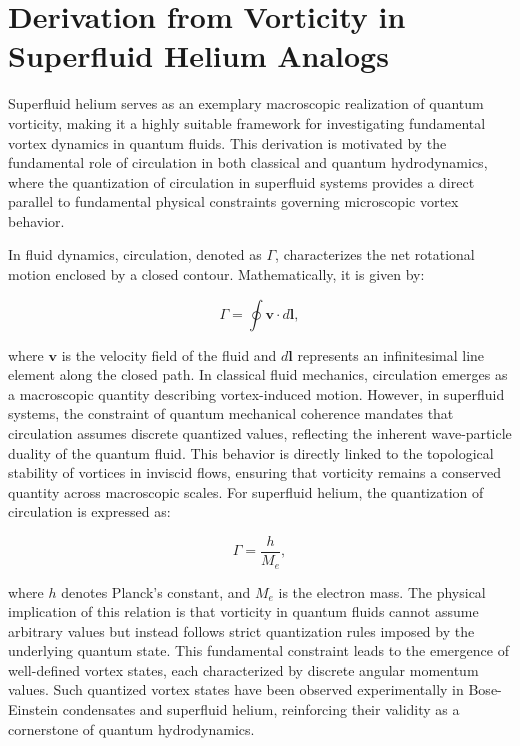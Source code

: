 \documentclass[a4paper,10pt]{article}
\begin{document}
    \section*{Derivation from Vorticity in Superfluid Helium Analogs}

Superfluid helium serves as an exemplary macroscopic realization of quantum vorticity, making it a highly suitable framework for investigating fundamental vortex dynamics in quantum fluids. This derivation is motivated by the fundamental role of circulation in both classical and quantum hydrodynamics, where the quantization of circulation in superfluid systems provides a direct parallel to fundamental physical constraints governing microscopic vortex behavior.


In fluid dynamics, circulation, denoted as $\Gamma$, characterizes the net rotational motion enclosed by a closed contour. Mathematically, it is given by:

\begin{equation*}
\Gamma = \oint \mathbf{v} \cdot d\mathbf{l},
\label{eq:circulation_definition}
\end{equation*}

where $\mathbf{v}$ is the velocity field of the fluid and $d\mathbf{l}$ represents an infinitesimal line element along the closed path. In classical fluid mechanics, circulation emerges as a macroscopic quantity describing vortex-induced motion. However, in superfluid systems, the constraint of quantum mechanical coherence mandates that circulation assumes discrete quantized values, reflecting the inherent wave-particle duality of the quantum fluid. This behavior is directly linked to the topological stability of vortices in inviscid flows, ensuring that vorticity remains a conserved quantity across macroscopic scales. For superfluid helium, the quantization of circulation is expressed as:

\begin{equation*}
\Gamma = \frac{h}{M_e},
\label{eq:circulation}
\end{equation*}

where $h$ denotes Planck's constant, and  $ M_e $ is the electron mass. The physical implication of this relation is that vorticity in quantum fluids cannot assume arbitrary values but instead follows strict quantization rules imposed by the underlying quantum state. This fundamental constraint leads to the emergence of well-defined vortex states, each characterized by discrete angular momentum values. Such quantized vortex states have been observed experimentally in Bose-Einstein condensates and superfluid helium, reinforcing their validity as a cornerstone of quantum hydrodynamics.
\end{document}
